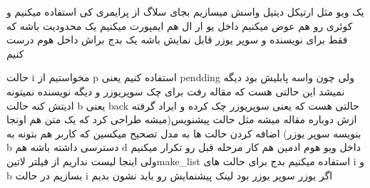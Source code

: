 \documentclass{article}
\begin{document}
			 یک ویو مثل ارتیکل دیتیل واسش میسازیم بجای سلاگ از پرایمری کی استفاده میکنیم و کوئری رو هم عوض میکنیم
			 داخل یو ار ال هم ایمپورت میکنیم
			 یک محدودیت باشه که فقط برای نویسنده و سوپر یوزر قابل نمایش باشه
			 یک بدج براش داخل هوم درست کنیم
			
	
		حالت i مخواستیم از p استفاده کنیم یعنی pendding ولی چون واسه پابلیش بود دیگه نمیشد این حالتی هست که مقاله رفت برای چک سوپریوزر
		و دیگه نویسنده نمیتونه ادیتش کنه حالت b یعنی back حالتی هست که یعنی سوپریوزر چک کرده و ایراد گرفته ازش دوباره مقاله میشه مثل حالت
		پیشنویس(میشه طراحی کرد که یک متن هم اونجا بنویسه سوپر یوزر)
			 اضافه کردن حالت ها به مدل
			 تصحیح میکسین که کاربر هم بتونه به b دسترسی داشته باشه هم d 
			 داخل ویو هوم ادمین هم کار مرحله قبل رو تکرار میکنیم ولی اینجا لیست نداریم از فیلتر ‌لاتین{make\_list} استفاده میکنیم
			 بدج برای حالت های i و b بسازیم 
			 در حالت i اگر یوزر سوپر یوزر بود لینک پیشنمایش رو باید نشون بدیم
\end{document}
